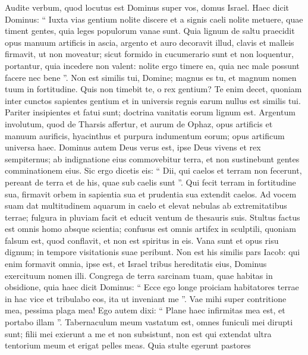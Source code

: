 \begin{biblechapter}
\begin{biblechapter}
\begin{biblechapter}
\begin{biblechapter}
\begin{biblechapter}
\begin{biblechapter}
\begin{biblechapter}
\begin{biblechapter}
\begin{biblechapter}
\begin{biblechapter}
\verse Audite verbum, quod locutus est Dominus super vos, domus Israel. 
\verse Haec dicit Dominus:
 “ Iuxta vias gentium nolite discere
 et a signis caeli nolite metuere,
 quae timent gentes,
 \verse quia leges populorum vanae sunt.
 Quia lignum de saltu praecidit
 opus manuum artificis in ascia,
 \verse argento et auro decoravit illud,
 clavis et malleis firmavit,
 ut non moveatur;
 \verse sicut formido in cucumerario sunt
 et non loquentur,
 portantur, quia incedere non valent:
 nolite ergo timere ea,
 quia nec male possunt facere nec bene ”.
 \verse Non est similis tui, Domine;
 magnus es tu,
 et magnum nomen tuum in fortitudine.
 \verse Quis non timebit te, o rex gentium?
 Te enim decet,
 quoniam inter cunctos sapientes gentium
 et in universis regnis earum nullus est similis tui.
 \verse Pariter insipientes et fatui sunt;
 doctrina vanitatis eorum lignum est.
 \verse Argentum involutum, quod de Tharsis affertur,
 et aurum de Ophaz,
 opus artificis et manuum aurificis,
 hyacinthus et purpura indumentum eorum;
 opus artificum universa haec.
 \verse Dominus autem Deus verus est,
 ipse Deus vivens et rex sempiternus;
 ab indignatione eius commovebitur terra,
 et non sustinebunt gentes comminationem eius.
 \verse Sic ergo dicetis eis: “ Dii, qui caelos et terram non fecerunt, pereant de terra et de his, quae sub caelis sunt ”.
 \verse Qui fecit terram in fortitudine sua,
 firmavit orbem in sapientia sua
 et prudentia sua extendit caelos.
 \verse Ad vocem suam dat multitudinem aquarum in caelo
 et elevat nebulas ab extremitatibus terrae;
 fulgura in pluviam facit
 et educit ventum de thesauris suis.
 \verse Stultus factus est omnis homo absque scientia;
 confusus est omnis artifex in sculptili,
 quoniam falsum est, quod conflavit,
 et non est spiritus in eis.
 \verse Vana sunt et opus risu dignum;
 in tempore visitationis suae peribunt.
 \verse Non est his similis pars Iacob:
 qui enim formavit omnia, ipse est,
 et Israel tribus hereditatis eius,
 Dominus exercituum nomen illi.
 \verse Congrega de terra sarcinam tuam,
 quae habitas in obsidione,
 \verse quia haec dicit Dominus:
 “ Ecce ego longe proiciam habitatores terrae in hac vice
 et tribulabo eos, ita ut inveniant me ”.
 \verse Vae mihi super contritione mea,
 pessima plaga mea!
 Ego autem dixi:
 “ Plane haec infirmitas mea est,
 et portabo illam ”.
 \verse Tabernaculum meum vastatum est, omnes funiculi mei dirupti sunt;
 filii mei exierunt a me et non subsistunt,
 non est qui extendat ultra tentorium meum
 et erigat pelles meas.
 \verse Quia stulte egerunt pastores

\end{biblechapter}
\end{biblechapter}
\end{biblechapter}
\end{biblechapter}
\end{biblechapter}
\end{biblechapter}
\end{biblechapter}
\end{biblechapter}
\end{biblechapter}
\end{biblechapter}
